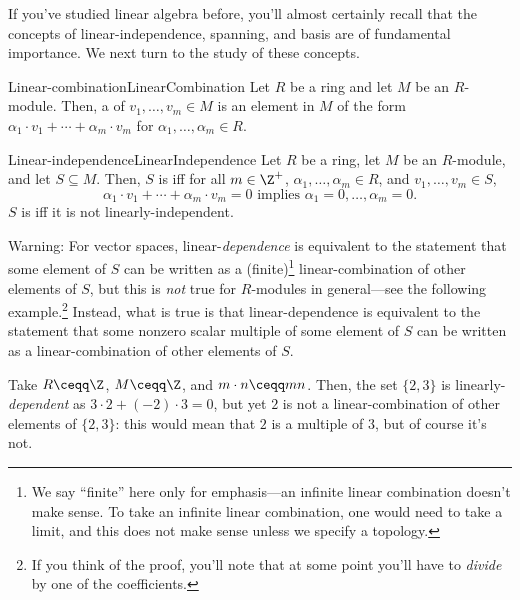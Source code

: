 If you've studied linear algebra before, you'll almost certainly recall that the concepts of linear-independence, spanning, and basis are of fundamental importance.  We next turn to the study of these concepts.
\begin{dfn}{Linear-combination}{LinearCombination}
Let $R$ be a ring and let $M$ be an $R$-module.  Then, a  of $v_1,\ldots ,v_m\in M$ is an element in $M$ of the form $\alpha _1\cdot v_1+\cdots +\alpha _m\cdot v_m$ for $\alpha _1,\ldots ,\alpha _m\in R$.
\end{dfn}
\begin{dfn}{Linear-independence}{LinearIndependence}
Let $R$ be a ring, let $M$ be an $R$-module, and let $S\subseteq M$.  Then, $S$ is  iff for all $m\in \Z ^+$, $\alpha _1,\ldots ,\alpha _m\in R$, and $v_1,\ldots ,v_m\in S$,
\begin{equation}
\alpha _1\cdot v_1+\cdots +\alpha _m\cdot v_m=0\text{ implies }\alpha _1=0,\ldots ,\alpha _m=0.
\end{equation}
$S$ is  iff it is not linearly-independent.
\begin{wrn}
Warning:  For vector spaces, linear-\emph{dependence} is equivalent to the statement that some element of $S$ can be written as a (finite)\footnote{We say ``finite'' here only for emphasis---an infinite linear combination doesn't make sense.  To take an infinite linear combination, one would need to take a limit, and this does not make sense unless we specify a topology.} linear-combination of other elements of $S$, but this is \emph{not} true for $R$-modules in general---see the following example.\footnote{If you think of the proof, you'll note that at some point you'll have to \emph{divide} by one of the coefficients.}  Instead, what is true is that linear-dependence is equivalent to the statement that some nonzero scalar multiple of some element of $S$ can be written as a linear-combination of other elements of $S$.
\end{wrn}
\end{dfn}
\begin{exm}{}{}
Take $R\ceqq \Z$, $M\ceqq \Z$, and $m\cdot n\ceqq mn$.  Then, the set $\{ 2,3\}$ is linearly-\emph{dependent} as $3\cdot 2+(-2)\cdot 3=0$, but yet $2$ is not a linear-combination of other elements of $\{ 2,3\}$:  this would mean that $2$ is a multiple of $3$, but of course it's not.
\end{exm}

